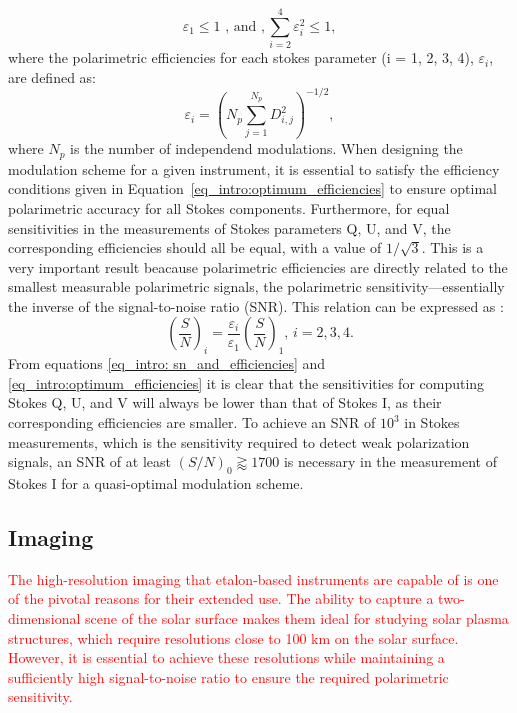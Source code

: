 \begin{equation}
  \varepsilon _ 1 \leqslant 1 \text{     , and     }, \sum _ {i = 2} ^4 \varepsilon _ i ^2 \leqslant 1,
  \label{eq_intro:optimum_efficiencies}
\end{equation}
where the polarimetric efficiencies for each stokes parameter (i = 1, 2, 3, 4), $\varepsilon _ i$, are defined as:
\begin{equation}
  \varepsilon _ i = \left( N_p \sum _ {j = 1} ^ {N_p} D _ {i, j} ^2\right) ^{-1/2},
  \label{eq_intro: polarimetric_efficiencies_definition}
\end{equation}
where $N_p$ is the number of independend modulations. 
When designing the modulation scheme for a given instrument, it is essential to satisfy the efficiency conditions given in Equation~\eqref{eq_intro:optimum_efficiencies} to ensure optimal polarimetric accuracy for all Stokes components. Furthermore, for equal sensitivities in the measurements of Stokes parameters Q, U, and V, the corresponding efficiencies should all be equal, with a value of $1/\sqrt{3}$. This is a very important result beacause polarimetric efficiencies are directly related to the smallest measurable polarimetric signals, the polarimetric sensitivity—essentially the inverse of the signal-to-noise ratio (SNR). This relation can be expressed as \citep{optimum_modulation}:
\begin{equation}
  \left( \frac{S}{N}\right)_i = \frac{\varepsilon _ i}{\varepsilon _ 1} \left(\frac{S}{N}\right)_1 \text{,    } i = 2, 3, 4 .
  \label{eq_intro: sn_and_efficiencies}
\end{equation}
From equations \eqref{eq_intro: sn_and_efficiencies} and \eqref{eq_intro:optimum_efficiencies} it is clear that the sensitivities for computing Stokes Q, U, and V will always be lower than that of Stokes I, as their corresponding efficiencies are smaller. To achieve an SNR of $10^3$ in Stokes measurements, which is the sensitivity required to detect weak polarization signals, an SNR of at least $ \left(S/N \right)_0 \gtrapprox 1700$ is necessary in the measurement of Stokes I for a quasi-optimal modulation scheme.

\subsection{\label{susec_spectropolarimeters: Imaging}Imaging}

\textcolor{red}{The high-resolution imaging that etalon-based instruments are capable of is one of the pivotal reasons for their extended use. The ability to capture a two-dimensional scene of the solar surface makes them ideal for studying solar plasma structures, which require resolutions close to 100 km on the solar surface. However, it is essential to achieve these resolutions while maintaining a sufficiently high signal-to-noise ratio to ensure the required polarimetric sensitivity.}

